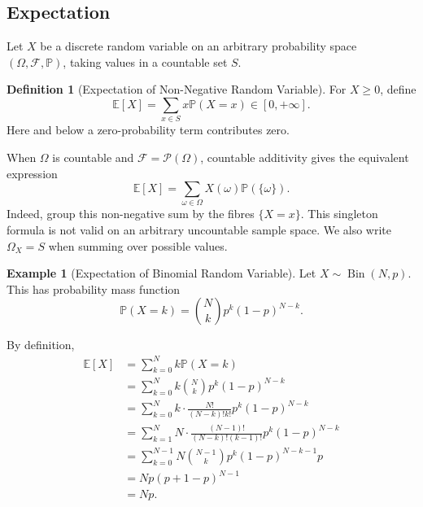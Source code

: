 \documentclass[11pt]{article}
\numberwithin{equation}{section}
\theoremstyle{definition}
\newtheorem{definition}[theorem]{Definition}
\newtheorem{example}[theorem]{Example}
\theoremstyle{remark}
\newcommand{\pqty}[1]{\left(#1\right)}
\newcommand{\bqty}[1]{\left[#1\right]}
\newcommand{\powerset}{\mathcal P}
\newcommand{\eventSpace}{\mathcal F}
\newcommand{\Prob}{\mathbb P}
\newcommand{\Expt}{\mathbb E}
\newcommand{\Binomial}{\operatorname{Bin}}
\begin{document}
\subsection{Expectation}
Let \(X\) be a discrete random variable on an arbitrary probability space
\((\Omega,\eventSpace,\Prob)\), taking values in a countable set \(S\).
\begin{definition}[Expectation of Non-Negative Random Variable]\label{probability-definition-023}
\label{probability-def:expectation-non-negative}
For \(X\ge0\), define
\[\Expt[X]=\sum_{x\in S}x\Prob(X=x)\in[0,+\infty].\]
Here and below a zero-probability term contributes zero.
\end{definition}
When \(\Omega\) is countable and \(\eventSpace=\powerset(\Omega)\),
countable additivity gives the equivalent expression
\[\Expt[X]=\sum_{\omega\in\Omega}X(\omega)\Prob(\{\omega\}).\]
Indeed, group this non-negative sum by the fibres \(\{X=x\}\).
This singleton formula is not valid on an arbitrary uncountable sample space.
We also write \(\Omega_X=S\) when summing over possible values.

\begin{example}[Expectation of Binomial Random Variable]\label{probability-example-020}
    \label{probability-ex:expectation-binomial}%
    Let \(X \sim \Binomial\pqty{N, p}\). This has probability mass function
    \[
        \Prob\pqty{X = k} = \binom{N}{k} p^k \pqty{1 - p}^{N - k}.
    \]

    By definition,
    \begin{align*}
        \Expt\bqty{X} &= \sum_{k = 0}^{N} k \Prob\pqty{X = k} \\
        &= \sum_{k = 0}^{N} k \binom{N}{k} p^k \pqty{1 - p}^{N - k} \\
        &= \sum_{k = 0}^{N} k \cdot \frac{N!}{\pqty{N - k}! k!} p^k \pqty{1 - p}^{N - k} \\
        &= \sum_{k = 1}^{N} N \cdot \frac{\pqty{N - 1}!}{\pqty{N - k}! \pqty{k - 1}!} p^k \pqty{1 - p}^{N - k} \\
        &= \sum_{k = 0}^{N - 1} N \binom{N - 1}{k} p^{k} \pqty{1 - p}^{N - k - 1} p \\
        &= Np \pqty{p + 1 - p}^{N - 1} \\
        &= Np.
    \end{align*}
\end{example}
\end{document}
